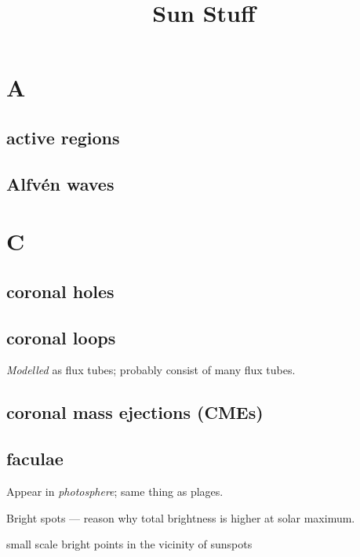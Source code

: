 \documentclass[12pt]{article}
\title{\vspace{-0.5in}Sun Stuff}
\author{}
\date{}
\begin{document}
\maketitle

\vspace{-1in}

\section*{A}

\subsection*{active regions}

\subsection*{Alfv\'en waves}

\section*{C}

\subsection*{coronal holes}

\subsection*{coronal loops}
\begin{itemize*}
    \item \emph{Modelled} as flux tubes; probably consist of
        many flux tubes.
\end{itemize*}

\subsection*{coronal mass ejections (CMEs)}

\subsection*{faculae}
    \begin{itemize*}
        \item Appear in \emph{photosphere}; same thing as plages.
        \item Bright spots --- reason why total brightness is higher at
            solar maximum.
        \item small scale bright points in the vicinity of sunspots
    \end{itemize*}
\end{document}
